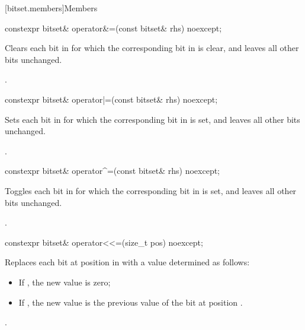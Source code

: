 [bitset.members]{Members}

%
\begin{itemdecl}
constexpr bitset& operator&=(const bitset& rhs) noexcept;
\end{itemdecl}

\begin{itemdescr}
\pnum
\effects
Clears each bit in
for which the corresponding bit in  is clear, and leaves all other bits unchanged.

\pnum
\returns
{}.
\end{itemdescr}

%
\begin{itemdecl}
constexpr bitset& operator|=(const bitset& rhs) noexcept;
\end{itemdecl}

\begin{itemdescr}
\pnum
\effects
Sets each bit in
for which the corresponding bit in  is set, and leaves all other bits unchanged.

\pnum
\returns
{}.
\end{itemdescr}

%
\begin{itemdecl}
constexpr bitset& operator^=(const bitset& rhs) noexcept;
\end{itemdecl}

\begin{itemdescr}
\pnum
\effects
Toggles each bit in
for which the corresponding bit in  is set, and leaves all other bits unchanged.

\pnum
\returns
{}.
\end{itemdescr}

%
\begin{itemdecl}
constexpr bitset& operator<<=(size_t pos) noexcept;
\end{itemdecl}

\begin{itemdescr}
\pnum
\effects
Replaces each bit at position  in
with a value determined as follows:

\begin{itemize}
\item
If , the new value is zero;
\item
If , the new value is the previous
value of the bit at position .
\end{itemize}

\pnum
\returns
{}.
\end{itemdescr}

